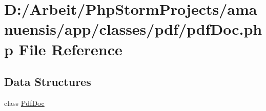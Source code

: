 \hypertarget{a00096}{}\section{D\+:/\+Arbeit/\+Php\+Storm\+Projects/amanuensis/app/classes/pdf/pdf\+Doc.php File Reference}
\label{a00096}
\subsection*{Data Structures}
\begin{DoxyCompactItemize}
\item 
class \hyperlink{a00034}{Pdf\+Doc}
\end{DoxyCompactItemize}

